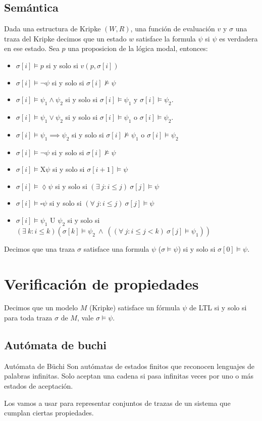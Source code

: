 \subsection{Semántica}
Dada una estructura de Kripke $(W,R)$, una función de evaluación $v$ y $\sigma$ una traza del Kripke decimos que un estado $w$ satisface la formula $\psi$ si $\psi$ es verdadera en ese estado. Sea $p$ una proposicion de la lógica modal, entonces:
\begin{itemize}
    \item $\sigma[i] \vDash p$ si y solo si $v(p,\sigma[i])$
    \item $\sigma[i] \vDash \lnot\psi$ si y solo si $\sigma[i] \nvDash \psi$
    \item $\sigma[i] \vDash \psi_1\land\psi_2$ si y solo si $\sigma[i] \vDash \psi_1$ y $\sigma[i] \vDash \psi_2$.
    \item $\sigma[i] \vDash \psi_1\lor\psi_2$ si y solo si $\sigma[i] \vDash \psi_1$ o $\sigma[i] \vDash \psi_2$.
    \item $\sigma[i] \vDash \psi_1\implies\psi_2$ si y solo si $\sigma[i] \nvDash \psi_1$ o $\sigma[i] \vDash \psi_2$
    \item $\sigma[i] \vDash \lnot\psi$ si y solo si $\sigma[i] \nvDash \psi$
    \item $\sigma[i] \vDash \text{X}\psi$ si y solo si $\sigma[i+1]\vDash \psi$
    \item $\sigma[i] \vDash \lozenge \psi$ si y solo si $(\exists~j: i \leq j)~\sigma[j] \vDash \psi$
    \item $\sigma[i] \vDash \square \psi$  si y solo si $(\forall~j: i \leq j)~\sigma[j] \vDash \psi$
    \item $\sigma[i] \vDash \psi_1 \text{ U } \psi_2$ si y solo si $(\exists~k: i \leq k) (\sigma[k] \vDash \psi_2 ~\wedge~ ((\forall~j: i \leq j < k)~\sigma[j] \vDash \psi_1))$
\end{itemize}

Decimos que una traza $\sigma$ satisface una formula $\psi$ ($\sigma\vDash\psi$) si y solo si $\sigma[0] \vDash \psi$.


\newpage
\section{Verificación de propiedades}
Decimos que un modelo $M$ (Kripke) satisface un fórmula $\psi$ de LTL si y solo si para toda traza $\sigma$ de $M$, vale $\sigma\vDash\psi$.

\subsection{Autómata de buchi}
\begin{definicion}{Autómata de Büchi}
Son autómatas de estados finitos que reconocen lenguajes de palabras infinitas. Solo aceptan una cadena si pasa infinitas veces por uno o más estados de aceptación.

Los vamos a usar para representar conjuntos de trazas de un sistema que cumplan ciertas propiedades. 
\end{definicion}

